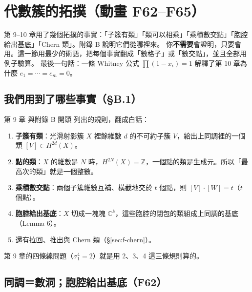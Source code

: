 
\section{代數簇的拓撲（動畫 F62--F65）}\label{sec:f-appB}

\begin{keybox}
第 9--10 章用了幾個拓撲的事實：「子簇有類」「類可以相乘」「乘積數交點」「胞腔給出基底」「Chern 類」。附錄 B 說明它們從哪裡來。
你\textbf{不需要}會證明，只要會用。這一節用最少的術語，把每個事實翻成「數格子」或「數交點」，並且全部用例子驗算。
最後一句話：一條 Whitney 公式 $\prod(1-x_i)=1$ 解釋了第 10 章為什麼 $e_1=\cdots=e_m=0$。
\end{keybox}

\subsection{我們用到了哪些事實（\S B.1）}\label{sec:f-facts}

第 9 章  與附錄 B 開頭  列出的規則，翻成白話：
\begin{enumerate}[nosep]
\item \textbf{子簇有類}：光滑射影簇 $X$ 裡餘維數 $d$ 的不可約子簇 $V$，給出上同調裡的一個類 $[V]\in H^{2d}(X)$。
\item \textbf{點的類}：$X$ 的維數是 $N$ 時，$H^{2N}(X)=\mathbb Z$，一個點的類是生成元。所以「最高次的類」就是一個整數。
\item \textbf{乘積數交點}：兩個子簇維數互補、橫截地交於 $t$ 個點，則 $[V]\cdot[W]=t$（$t$ 個點）。
\item \textbf{胞腔給出基底}：$X$ 切成一塊塊 $\mathbb C^k$，這些胞腔的閉包的類組成上同調的基底（Lemma 6）。
\item 還有拉回、推出與 Chern 類（\S\ref{sec:f-chern}）。
\end{enumerate}
第 9 章的四條線問題（$\sigma_1^4=2$）就是用 2、3、4 這三條規則算的。

\subsection{同調＝數洞；胞腔給出基底（F62）}\label{sec:f-cells}

